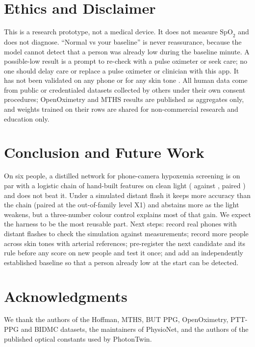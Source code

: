 \documentclass[11pt,letterpaper]{article}
\newcommand{\spo}{\ensuremath{\mathrm{SpO}_2}}
\begin{document}
\section{Ethics and Disclaimer}\label{sec:ethics}
This is a research prototype, not a medical device. It does not measure \spo{} and does not diagnose. ``Normal vs your baseline'' is never reassurance, because the model cannot detect that a person was already low during the baseline minute. A possible-low result is a prompt to re-check with a pulse oximeter or seek care; no one should delay care or replace a pulse oximeter or clinician with this app. It has not been validated on any phone or for any skin tone \cite{bickler2005,feiner2007,sjoding2020}. All human data come from public or credentialed datasets collected by others under their own consent procedures; OpenOximetry and MTHS results are published as aggregates only, and weights trained on their rows are shared for non-commercial research and education only.

\section{Conclusion and Future Work}\label{sec:conclusion}
On six people, a distilled network for phone-camera hypoxemia screening is on par with a logistic chain of hand-built features on clean light (\WinLzero{} against \ChainLzero{}, paired \WinLzeroDiff{} \WinLzeroDiffCI{}) and does not beat it. Under a simulated distant flash it keeps more accuracy than the chain (paired \WinXoneDiff{} \WinXoneDiffCI{} at the out-of-family level X1) and abstains more as the light weakens, but a three-number colour control explains most of that gain. We expect the harness to be the most reusable part. Next steps: record real phones with distant flashes to check the simulation against measurements; record more people across skin tones with arterial references; pre-register the next candidate and its rule before any score on new people and test it once; and add an independently established baseline so that a person already low at the start can be detected.

\section*{Acknowledgments}
We thank the authors of the Hoffman, MTHS, BUT PPG, OpenOximetry, PTT-PPG and BIDMC datasets, the maintainers of PhysioNet, and the authors of the published optical constants used by PhotonTwin.

{\footnotesize
{}


}
\end{document}
